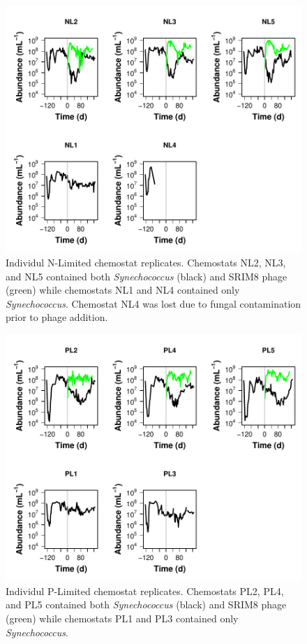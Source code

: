\documentclass[]{article}
\begin{document}
\begin{figure}[htbp]
\centering
\includegraphics{analysis_ecoevostoich_files/figure-latex/unnamed-chunk-2-1.pdf}
\caption{Individul N-Limited chemostat replicates. Chemostats NL2, NL3,
and NL5 contained both \emph{Synechococcus} (black) and SRIM8 phage
(green) while chemostats NL1 and NL4 contained only
\emph{Synechococcus}. Chemostat NL4 was lost due to fungal contamination
prior to phage addition.}
\end{figure}

\newpage

\begin{figure}[htbp]
\centering
\includegraphics{analysis_ecoevostoich_files/figure-latex/unnamed-chunk-3-1.pdf}
\caption{Individul P-Limited chemostat replicates. Chemostats PL2, PL4,
and PL5 contained both \emph{Synechococcus} (black) and SRIM8 phage
(green) while chemostats PL1 and PL3 contained only
\emph{Synechococcus}.}
\end{figure}
\end{document}
